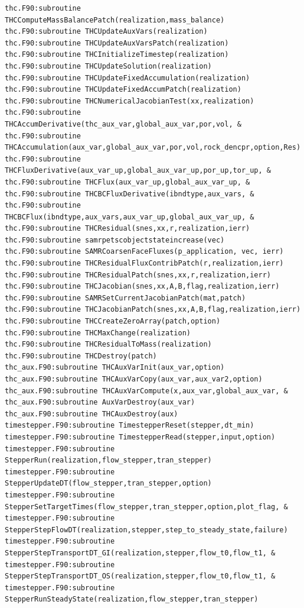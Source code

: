 \documentclass[12pt]{article}
\begin{document}
\begin{verbatim}
thc.F90:subroutine THCComputeMassBalancePatch(realization,mass_balance)
thc.F90:subroutine THCUpdateAuxVars(realization)
thc.F90:subroutine THCUpdateAuxVarsPatch(realization)
thc.F90:subroutine THCInitializeTimestep(realization)
thc.F90:subroutine THCUpdateSolution(realization)
thc.F90:subroutine THCUpdateFixedAccumulation(realization)
thc.F90:subroutine THCUpdateFixedAccumPatch(realization)
thc.F90:subroutine THCNumericalJacobianTest(xx,realization)
thc.F90:subroutine THCAccumDerivative(thc_aux_var,global_aux_var,por,vol, &
thc.F90:subroutine THCAccumulation(aux_var,global_aux_var,por,vol,rock_dencpr,option,Res)
thc.F90:subroutine THCFluxDerivative(aux_var_up,global_aux_var_up,por_up,tor_up, &
thc.F90:subroutine THCFlux(aux_var_up,global_aux_var_up, &
thc.F90:subroutine THCBCFluxDerivative(ibndtype,aux_vars, &
thc.F90:subroutine THCBCFlux(ibndtype,aux_vars,aux_var_up,global_aux_var_up, &
thc.F90:subroutine THCResidual(snes,xx,r,realization,ierr)
thc.F90:subroutine samrpetscobjectstateincrease(vec)
thc.F90:subroutine SAMRCoarsenFaceFluxes(p_application, vec, ierr)
thc.F90:subroutine THCResidualFluxContribPatch(r,realization,ierr)
thc.F90:subroutine THCResidualPatch(snes,xx,r,realization,ierr)
thc.F90:subroutine THCJacobian(snes,xx,A,B,flag,realization,ierr)
thc.F90:subroutine SAMRSetCurrentJacobianPatch(mat,patch) 
thc.F90:subroutine THCJacobianPatch(snes,xx,A,B,flag,realization,ierr)
thc.F90:subroutine THCCreateZeroArray(patch,option)
thc.F90:subroutine THCMaxChange(realization)
thc.F90:subroutine THCResidualToMass(realization)
thc.F90:subroutine THCDestroy(patch)
thc_aux.F90:subroutine THCAuxVarInit(aux_var,option)
thc_aux.F90:subroutine THCAuxVarCopy(aux_var,aux_var2,option)
thc_aux.F90:subroutine THCAuxVarCompute(x,aux_var,global_aux_var, &
thc_aux.F90:subroutine AuxVarDestroy(aux_var)
thc_aux.F90:subroutine THCAuxDestroy(aux)
timestepper.F90:subroutine TimestepperReset(stepper,dt_min)
timestepper.F90:subroutine TimestepperRead(stepper,input,option)
timestepper.F90:subroutine StepperRun(realization,flow_stepper,tran_stepper)
timestepper.F90:subroutine StepperUpdateDT(flow_stepper,tran_stepper,option)
timestepper.F90:subroutine StepperSetTargetTimes(flow_stepper,tran_stepper,option,plot_flag, &
timestepper.F90:subroutine StepperStepFlowDT(realization,stepper,step_to_steady_state,failure)
timestepper.F90:subroutine StepperStepTransportDT_GI(realization,stepper,flow_t0,flow_t1, &
timestepper.F90:subroutine StepperStepTransportDT_OS(realization,stepper,flow_t0,flow_t1, &
timestepper.F90:subroutine StepperRunSteadyState(realization,flow_stepper,tran_stepper)

\end{verbatim}
\end{document}
